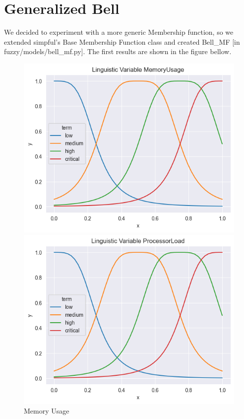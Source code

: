 \documentclass[titlepage]{article}
\begin{document}
\section{Generalized Bell}
We decided to experiment with a more generic Membership function, so we
extended simpful's Base Membership Function class and created Bell\_MF [in fuzzy/models/bell\_mf.py].
The first results are shown in the figure bellow.


\begin{figure}[htbp]
    \centering
    \begin{minipage}{0.32\textwidth}
        \centering
        \includegraphics[width=\textwidth]{../images/first_bell/MemoryUsage}
        \caption{Memory Usage}
        \label{fig:first_bell_processor_load}
    \end{minipage}
    \hfill
    \begin{minipage}{0.32\textwidth}
        \centering
        \includegraphics[width=\textwidth]{../images/first_bell/ProcessorLoad}

\end{minipage}
\end{figure}
\end{document}
